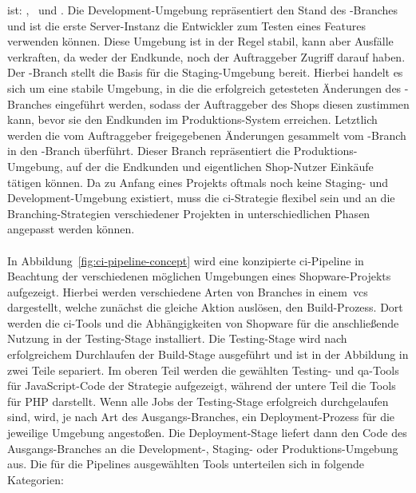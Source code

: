 ist: ,\  und .
Die Development-Umgebung repräsentiert den Stand des -Branches und ist die erste Server-Instanz
die Entwickler zum Testen eines Features verwenden können.
Diese Umgebung ist in der Regel stabil, kann aber Ausfälle verkraften, da weder der Endkunde, noch der Auftraggeber
Zugriff darauf haben.
Der -Branch stellt die Basis für die Staging-Umgebung bereit.
Hierbei handelt es sich um eine stabile Umgebung, in die die erfolgreich getesteten Änderungen des
-Branches eingeführt werden, sodass der Auftraggeber des Shops diesen zustimmen kann, bevor
sie den Endkunden im Produktions-System erreichen.
Letztlich werden die vom Auftraggeber freigegebenen Änderungen gesammelt vom -Branch in den
-Branch überführt.
Dieser Branch repräsentiert die Produktions-Umgebung, auf der die Endkunden und eigentlichen Shop-Nutzer Einkäufe
tätigen können.
Da zu Anfang eines Projekts oftmals noch keine Staging- und Development-Umgebung existiert, muss die
\acrshort{ci}-Strategie flexibel sein und an die Branching-Strategien verschiedener Projekten in unterschiedlichen
Phasen angepasst werden können.
\\\\
In Abbildung\ \ref{fig:ci-pipeline-concept} wird eine konzipierte \acrshort{ci}-Pipeline in Beachtung der verschiedenen
möglichen Umgebungen eines Shopware-Projekts aufgezeigt.
Hierbei werden verschiedene Arten von Branches in einem\ \acrshort{vcs} dargestellt, welche zunächst die gleiche Aktion
auslösen, den Build-Prozess.
Dort werden die \acrshort{ci}-Tools und die Abhängigkeiten von Shopware für die anschließende Nutzung in der
Testing-Stage installiert.
Die Testing-Stage wird nach erfolgreichem Durchlaufen der Build-Stage ausgeführt und ist in der Abbildung in zwei
Teile separiert.
Im oberen Teil werden die gewählten Testing- und \acrshort{qa}-Tools für JavaScript-Code der Strategie aufgezeigt,
während der untere Teil die Tools für PHP darstellt.
Wenn alle Jobs der Testing-Stage erfolgreich durchgelaufen sind, wird, je nach Art des Ausgangs-Branches, ein
Deployment-Prozess für die jeweilige Umgebung angestoßen.
Die Deployment-Stage liefert dann den Code des Ausgangs-Branches an die Development-, Staging- oder
Produktions-Umgebung aus.
Die für die Pipelines ausgewählten Tools unterteilen sich in folgende Kategorien:
\\\\
\noindent
